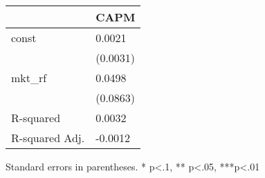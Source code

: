 \begin{table}
\caption{}
\label{}
\begin{center}
\begin{tabular}{ll}
\hline
               & CAPM      \\
\hline
const          & 0.0021    \\
               & (0.0031)  \\
mkt\_rf        & 0.0498    \\
               & (0.0863)  \\
R-squared      & 0.0032    \\
R-squared Adj. & -0.0012   \\
\hline
\end{tabular}
\end{center}
\end{table}
\bigskip
Standard errors in parentheses. \newline 
* p<.1, ** p<.05, ***p<.01
